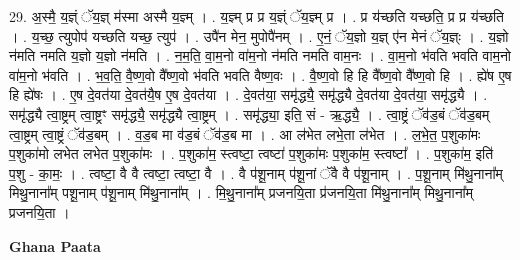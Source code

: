 \documentclass[17pt]{extarticle}
\begin{document}
29. अ॒स्मै॒ य॒ज्ञ्ं ॅय॒ज्ञ् म॑स्मा अस्मै य॒ज्ञ्म् । . य॒ज्ञ्म् प्र प्र य॒ज्ञ्ं ॅय॒ज्ञ्म् प्र । . प्र य॑च्छति यच्छति॒ प्र प्र य॑च्छति । . य॒च्छ॒ त्युपोप॑ यच्छति यच्छ॒ त्युप॑ । . उपै॑न मेन॒ मुपोपै॑नम् । . ए॒नं॒ ॅय॒ज्ञो य॒ज्ञ् ए॑न मेनं ॅय॒ज्ञ्ः । . य॒ज्ञो न॑मति नमति य॒ज्ञो य॒ज्ञो न॑मति । . न॒म॒ति॒ वा॒म॒नो वा॑म॒नो न॑मति नमति वाम॒नः । . वा॒म॒नो भ॑वति भवति वाम॒नो वा॑म॒नो भ॑वति । . भ॒व॒ति॒ वै॒ष्ण॒वो वै᳚ष्ण॒वो भ॑वति भवति वैष्ण॒वः । . वै॒ष्ण॒वो हि हि वै᳚ष्ण॒वो वै᳚ष्ण॒वो हि । . ह्ये॑ष ए॒ष हि ह्ये॑षः । . ए॒ष दे॒वत॑या दे॒वत॑यै॒ष ए॒ष दे॒वत॑या । . दे॒वत॑या॒ समृ॑द्ध्यै॒ समृ॑द्ध्यै दे॒वत॑या दे॒वत॑या॒ समृ॑द्ध्यै । . समृ॑द्ध्यै त्वा॒ष्ट्रम् त्वा॒ष्ट्रꣳ समृ॑द्ध्यै॒ समृ॑द्ध्यै त्वा॒ष्ट्रम् । . समृ॑द्ध्या॒ इति॒ सं - ऋ॒द्ध्यै॒ । . त्वा॒ष्ट्रं ॅव॑ड॒बं ॅव॑ड॒बम् त्वा॒ष्ट्रम् त्वा॒ष्ट्रं ॅव॑ड॒बम् । . व॒ड॒ब मा व॑ड॒बं ॅव॑ड॒ब मा । . आ ल॑भेत लभे॒ता ल॑भेत । . ल॒भे॒त॒ प॒शुका॑मः प॒शुका॑मो लभेत लभेत प॒शुका॑मः । . प॒शुका॑म॒ स्त्वष्टा॒ त्वष्टा॑ प॒शुका॑मः प॒शुका॑म॒ स्त्वष्टा᳚ । . प॒शुका॑म॒ इति॑ प॒शु - का॒मः॒ । . त्वष्टा॒ वै वै त्वष्टा॒ त्वष्टा॒ वै । . वै प॑शू॒नाम् प॑शू॒नां ॅवै वै प॑शू॒नाम् । . प॒शू॒नाम् मि॑थु॒नाना᳚म् मिथु॒नाना᳚म् पशू॒नाम् प॑शू॒नाम् मि॑थु॒नाना᳚म् । . मि॒थु॒नाना᳚म् प्रजनयि॒ता प्र॑जनयि॒ता मि॑थु॒नाना᳚म् मिथु॒नाना᳚म् प्रजनयि॒ता । \newline

\textbf{Ghana Paata } \newline
\end{document}
